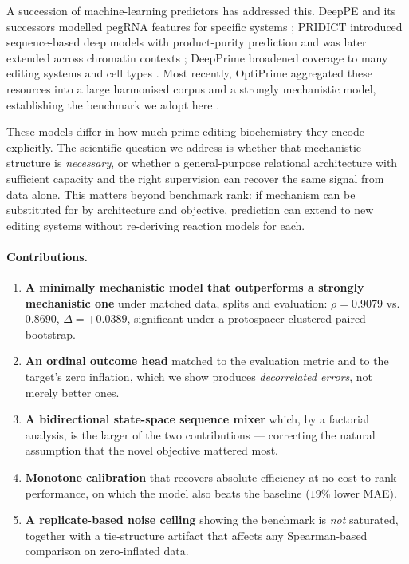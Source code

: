 \documentclass[11pt]{article}
\newcommand{\rhoS}{\rho}
\begin{document}
A succession of machine-learning predictors has addressed this. DeepPE and its
successors modelled pegRNA features for specific systems \citep{kim2021}; PRIDICT
introduced sequence-based deep models with product-purity prediction
\citep{mathis2023} and was later extended across chromatin contexts
\citep{mathis2024}; DeepPrime broadened coverage to many editing systems and cell
types \citep{yu2023}. Most recently, OptiPrime aggregated these resources into a large
harmonised corpus and a strongly mechanistic model, establishing the benchmark we adopt
here \citep{hsu2026}.

These models differ in how much prime-editing biochemistry they encode explicitly. The
scientific question we address is whether that mechanistic structure is
\emph{necessary}, or whether a general-purpose relational architecture with sufficient
capacity and the right supervision can recover the same signal from data alone. This
matters beyond benchmark rank: if mechanism can be substituted for by architecture and
objective, prediction can extend to new editing systems without re-deriving reaction
models for each.

\paragraph{Contributions.}
\begin{enumerate}
\item \textbf{A minimally mechanistic model that outperforms a strongly mechanistic
one} under matched data, splits and evaluation: $\rhoS=0.9079$ vs.\ $0.8690$,
$\Delta=+0.0389$, significant under a protospacer-clustered paired bootstrap.
\item \textbf{An ordinal outcome head} matched to the evaluation metric and to the
target's zero inflation, which we show produces \emph{decorrelated errors}, not merely
better ones.
\item \textbf{A bidirectional state-space sequence mixer} which, by a factorial
analysis, is the larger of the two contributions --- correcting the natural assumption
that the novel objective mattered most.
\item \textbf{Monotone calibration} that recovers absolute efficiency at no cost to
rank performance, on which the model also beats the baseline ($19\%$ lower MAE).
\item \textbf{A replicate-based noise ceiling} showing the benchmark is \emph{not}
saturated, together with a tie-structure artifact that affects any Spearman-based
comparison on zero-inflated data.
\end{enumerate}
\end{document}
